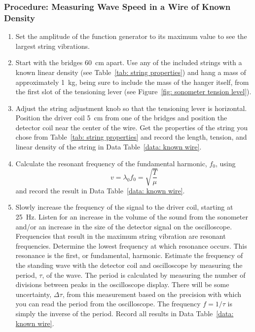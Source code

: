 \documentclass[addpoints]{physlabs}
\begin{document}
\begin{labsection}
\begin{experiment}
    \subsubsection*{Procedure: Measuring Wave Speed in a Wire of Known Density}

    \begin{enumerate}
        \item Set the amplitude of the function generator to its maximum value to see the largest string vibrations.

        \item Start with the bridges \qty{60}{\centi\meter} apart. Use any of the included strings with a known linear density (see Table~\ref{tab: string properties}) and hang a mass of approximately \qty{1}{\kilo\gram}, being sure to include the mass of the hanger itself, from the first slot of the tensioning lever (see Figure~\ref{fig: sonometer tension level}).
        
        \item Adjust the string adjustment knob so that the tensioning lever is horizontal. Position the driver coil \qty{5}{\centi\meter} from one of the bridges and position the detector coil near the center of the wire. Get the properties of the string you chose from Table~\ref{tab: string properties} and record the length, tension, and linear density of the string in Data Table~\ref{data: known wire}.

        \item Calculate the resonant frequency of the fundamental harmonic, $f_0$, using
        \[
            v = \lambda_0 f_0 = \sqrt{\frac{T}{\mu}}
        \]
        and record the result in Data Table~\ref{data: known wire}.

        \item Slowly increase the frequency of the signal to the driver coil, starting at \qty{25}{\hertz}. Listen for an increase in the volume of the sound from the sonometer and/or an increase in the size of the detector signal on the oscilloscope. Frequencies that result in the maximum string vibration are resonant frequencies. Determine the lowest frequency at which resonance occurs. This resonance is the first, or fundamental, harmonic. Estimate the frequency of the standing wave with the detector coil and oscilloscope by measuring the period, $\tau$, of the wave. The period is calculated by measuring the number of divisions between peaks in the oscilloscope display. There will be some uncertainty, $\Delta\tau$, from this measurement based on the precision with which you can read the period from the oscilloscope. The frequency $f=1/\tau$ is simply the inverse of the period. Record all results in Data Table~\ref{data: known wire}.


\end{enumerate}
\end{experiment}
\end{labsection}
\end{document}
